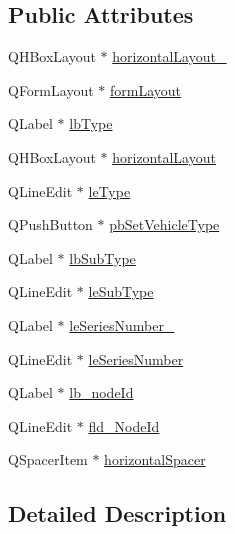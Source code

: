 \subsection*{Public Attributes}
\begin{DoxyCompactItemize}
\item 
Q\-H\-Box\-Layout $\ast$ \hyperlink{class_ui__mdt_tt_test_node_editor_a386195831ebfa1edfcb0e218865fa202}{horizontal\-Layout\-\_}
\item 
Q\-Form\-Layout $\ast$ \hyperlink{class_ui__mdt_tt_test_node_editor_af2d8200baeae5f243ad3210730021875}{form\-Layout}
\item 
Q\-Label $\ast$ \hyperlink{class_ui__mdt_tt_test_node_editor_a096da237fbb87146c89298a28a2c378c}{lb\-Type}
\item 
Q\-H\-Box\-Layout $\ast$ \hyperlink{class_ui__mdt_tt_test_node_editor_a911a7fedd30e2f09360b692efbb35dee}{horizontal\-Layout}
\item 
Q\-Line\-Edit $\ast$ \hyperlink{class_ui__mdt_tt_test_node_editor_a3b75c24851c96a8dd38b4782a532937b}{le\-Type}
\item 
Q\-Push\-Button $\ast$ \hyperlink{class_ui__mdt_tt_test_node_editor_a8affa39aad17128e9c1cab6309cb52fc}{pb\-Set\-Vehicle\-Type}
\item 
Q\-Label $\ast$ \hyperlink{class_ui__mdt_tt_test_node_editor_af4e675dc76fb542bb1f8f923203686b4}{lb\-Sub\-Type}
\item 
Q\-Line\-Edit $\ast$ \hyperlink{class_ui__mdt_tt_test_node_editor_aa13cb2bdfcae8b5180aa45fa692fe2db}{le\-Sub\-Type}
\item 
Q\-Label $\ast$ \hyperlink{class_ui__mdt_tt_test_node_editor_a37ee38b2300aacc91ded74a23bbcd4a4}{le\-Series\-Number\-\_}
\item 
Q\-Line\-Edit $\ast$ \hyperlink{class_ui__mdt_tt_test_node_editor_ac00d23feaa8b6c0c15e6350b74f105c8}{le\-Series\-Number}
\item 
Q\-Label $\ast$ \hyperlink{class_ui__mdt_tt_test_node_editor_a355c71a1917303359078289bd6c772a8}{lb\-\_\-node\-Id}
\item 
Q\-Line\-Edit $\ast$ \hyperlink{class_ui__mdt_tt_test_node_editor_a7e49d2c767ae5a5c3fd56870771275c3}{fld\-\_\-\-Node\-Id}
\item 
Q\-Spacer\-Item $\ast$ \hyperlink{class_ui__mdt_tt_test_node_editor_a42894314ac995c0e53fddc84c95dca9e}{horizontal\-Spacer}
\end{DoxyCompactItemize}


\subsection{Detailed Description}


